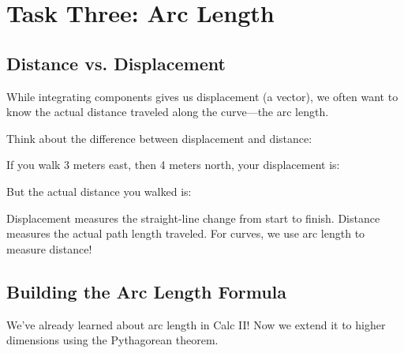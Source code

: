 \documentclass{ximera}
\begin{document}
\section*{Task Three: Arc Length}

\subsection*{Distance vs. Displacement}

While integrating components gives us displacement (a vector), we often want to know the actual distance traveled along the curve—the arc length.

\begin{problem}
Think about the difference between displacement and distance:

If you walk 3 meters east, then 4 meters north, your displacement is:
\begin{multipleChoice}
\end{multipleChoice}

But the actual distance you walked is:
\begin{multipleChoice}
\end{multipleChoice}

\begin{feedback}
Displacement measures the straight-line change from start to finish. Distance measures the actual path length traveled. For curves, we use arc length to measure distance!
\end{feedback}
\end{problem}

\subsection*{Building the Arc Length Formula}

We've already learned about arc length in Calc II! Now we extend it to higher dimensions using the Pythagorean theorem.
\end{document}
